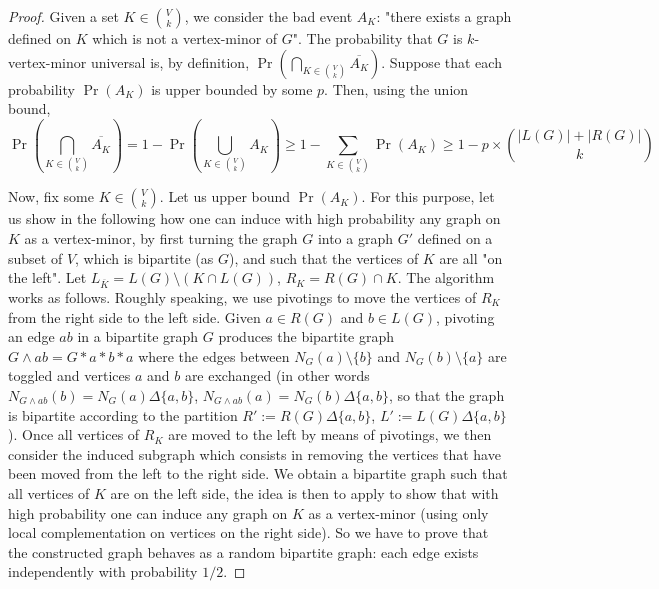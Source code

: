 \documentclass[10pt,a4paper]{article}
\newcommand{\gs}{\geqslant}
\newcommand{\sm}{\setminus}
\begin{document}
\begin{proof}
    Given a set $K \in {V \choose k}$, we consider the bad event $A_K$: "there exists a graph defined on $K$ which is not a vertex-minor of $G$". The probability that $G$ is $k$-vertex-minor universal is, by definition, $\Pr\left( \bigcap_{K \in {V \choose k}} \overline{A_K}\right)$. Suppose that each probability $\Pr(A_K)$ is upper bounded by some $p$. Then, using the union bound, $$\Pr\left( \bigcap_{K \in {V \choose k}} \overline{A_K}\right) = 1 - \Pr\left(\bigcup_{K \in {V \choose k}} A_K \right) \gs 1 - \sum_{K \in {V \choose k}} \Pr(A_K) \gs 1 - p\times {|L(G)|+|R(G)| \choose k}$$

    Now, fix some $K \in {V \choose k}$. Let us upper bound $\Pr(A_K)$. For this purpose, let us show in the following how one can induce with high probability any graph on $K$ as a vertex-minor, by first turning the graph $G$ into a graph $G'$ defined on a subset of $V$, which is bipartite (as $G$), and such that the vertices of $K$ are all "on the left". Let $L_{\overline K}=L(G)\sm (K\cap L(G))$, $R_K=R(G)\cap K$. The algorithm works as follows. Roughly speaking, we use pivotings to move the vertices of $R_K$ from the right side to the left side. Given $a\in R(G)$ and $b\in L(G)$, pivoting an edge $ab$ in a bipartite graph $G$ produces the bipartite graph $G\wedge ab=G*a*b*a$ where the edges between $N_G(a)\setminus \{b\}$ and $N_G(b)\setminus \{a\}$ are toggled and vertices $a$ and $b$ are exchanged (in other words $N_{G\wedge ab}(b)=N_G(a)\Delta \{a,b\}$, $N_{G\wedge ab}(a)=N_G(b)\Delta \{a,b\}$, so that the graph is bipartite according to the partition $R':=R(G)\Delta\{a,b\}$, $L':=L(G)\Delta\{a,b\}$). Once all vertices of $R_K$ are moved to the left by means of pivotings, we then consider the induced subgraph which consists in removing the vertices that have been moved from the left to the right side. We obtain a bipartite graph such that all vertices of $K$ are on the left side, the idea is then to apply  to show that with high probability one can induce any graph on $K$ as a vertex-minor (using only local complementation on vertices on the right side). So we have to prove that the constructed graph behaves as a random bipartite graph: each edge exists independently with probability $1/2$.


\end{proof}
\end{document}
